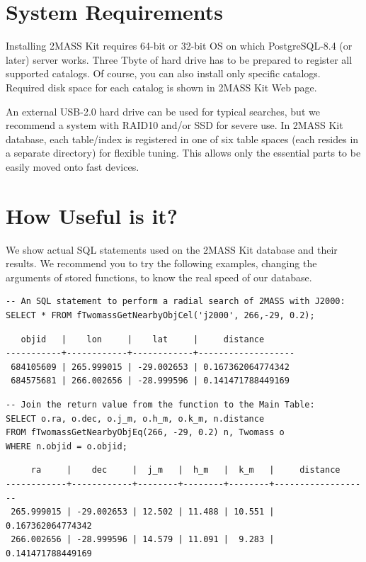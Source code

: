\section{System Requirements}

Installing 2MASS Kit requires 64-bit or 32-bit OS on which PostgreSQL-8.4 (or later) server works. Three Tbyte of hard drive has to be prepared to register all supported catalogs. Of course, you can also install only specific catalogs. Required disk space for each catalog is shown in 2MASS Kit Web page.

An external USB-2.0 hard drive can be used for typical searches, but we recommend a system with RAID10 and/or SSD for severe use. In 2MASS Kit database, each table/index is registered in one of six table spaces (each resides in a separate directory) for flexible tuning. This allows only the essential parts to be easily moved onto fast devices.


\section{How Useful is it?}

We show actual SQL statements used on the 2MASS Kit database and their results. We recommend you to try the following examples, changing the arguments of stored functions, to know the real speed of our database.

\begin{verbatim}
-- An SQL statement to perform a radial search of 2MASS with J2000:
SELECT * FROM fTwomassGetNearbyObjCel('j2000', 266,-29, 0.2);
\end{verbatim}

{\small
\begin{verbatim}
   objid   |    lon     |    lat     |     distance      
-----------+------------+------------+-------------------
 684105609 | 265.999015 | -29.002653 | 0.167362064774342
 684575681 | 266.002656 | -28.999596 | 0.141471788449169
\end{verbatim}
}

\begin{verbatim}
-- Join the return value from the function to the Main Table:
SELECT o.ra, o.dec, o.j_m, o.h_m, o.k_m, n.distance
FROM fTwomassGetNearbyObjEq(266, -29, 0.2) n, Twomass o
WHERE n.objid = o.objid;
\end{verbatim}

{\small
\begin{verbatim}
     ra     |    dec     |  j_m   |  h_m   |  k_m   |     distance     
------------+------------+--------+--------+--------+-------------------
 265.999015 | -29.002653 | 12.502 | 11.488 | 10.551 | 0.167362064774342
 266.002656 | -28.999596 | 14.579 | 11.091 |  9.283 | 0.141471788449169
\end{verbatim}
}


